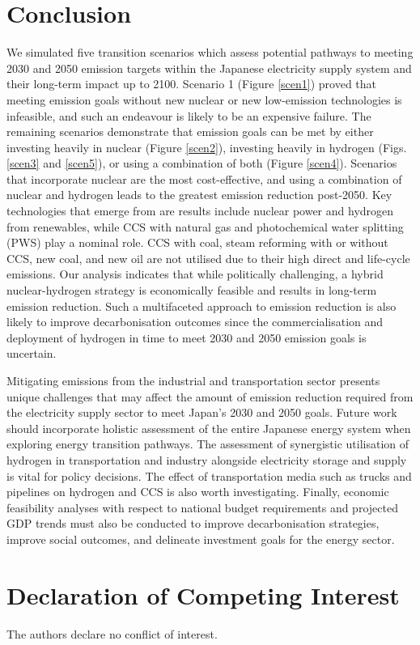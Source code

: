 \section{Conclusion} \label{Conclusion}

We simulated five transition scenarios which assess potential pathways to meeting 2030 and 2050 emission targets within the Japanese electricity supply system and their long-term impact up to 2100. Scenario 1 (Figure \ref{scen1}) proved that meeting emission goals without new nuclear or new low-emission technologies is infeasible, and such an endeavour is likely to be an expensive failure. The remaining scenarios demonstrate that emission goals can be met by either investing heavily in nuclear (Figure \ref{scen2}), investing heavily in hydrogen (Figs. \ref{scen3} and \ref{scen5}), or using a combination of both (Figure \ref{scen4}). Scenarios that incorporate nuclear are the most cost-effective, and using a combination of nuclear and hydrogen leads to the greatest emission reduction post-2050. Key technologies that emerge from are results include nuclear power and hydrogen from renewables, while \gls{CCS} with natural gas and photochemical water splitting (\gls{PWS}) play a nominal role. CCS with coal, steam reforming with or without CCS, new coal, and new oil are not utilised due to their high direct and life-cycle emissions. Our analysis indicates that while politically challenging, a hybrid nuclear-hydrogen strategy is economically feasible and results in long-term emission reduction. Such a multifaceted approach to emission reduction is also likely to improve decarbonisation outcomes since the commercialisation and deployment of hydrogen in time to meet 2030 and 2050 emission goals is uncertain.

Mitigating emissions from the industrial and transportation sector presents unique challenges that may affect the amount of emission reduction required from the electricity supply sector to meet Japan's 2030 and 2050 goals. Future work should incorporate holistic assessment of the entire Japanese energy system when exploring energy transition pathways. The assessment of synergistic utilisation of hydrogen in transportation and industry alongside electricity storage and supply is vital for policy decisions. The effect of transportation media such as trucks and pipelines on hydrogen and CCS is also worth investigating. Finally, economic feasibility analyses with respect to national budget requirements and projected GDP trends must also be conducted to improve decarbonisation strategies, improve social outcomes, and delineate investment goals for the energy sector.

\section{Declaration of Competing Interest}
The authors declare no conflict of interest.